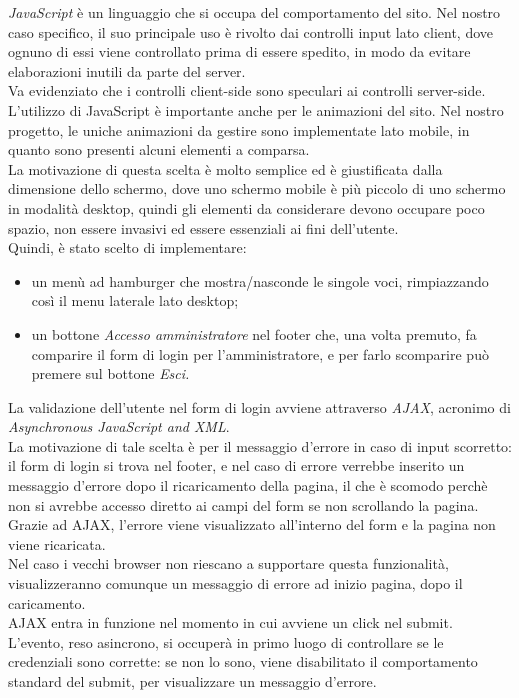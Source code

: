 ﻿\emph{JavaScript} è un linguaggio che si occupa del comportamento del sito. Nel nostro caso specifico, il suo principale uso è rivolto dai controlli 
input lato client, dove ognuno di essi viene controllato prima di essere spedito, in modo da evitare elaborazioni inutili da parte del server.\\
Va evidenziato che i controlli client-side sono speculari ai controlli server-side.\\
L'utilizzo di JavaScript è importante anche per le animazioni del sito. Nel nostro progetto, le uniche animazioni da gestire sono implementate 
lato mobile, in quanto sono presenti alcuni elementi a comparsa.\\
La motivazione di questa scelta è molto semplice ed è giustificata dalla dimensione dello schermo, dove uno schermo mobile è più piccolo di uno schermo
in modalità desktop, quindi gli elementi da considerare devono occupare poco spazio, non essere invasivi ed essere essenziali ai fini dell'utente. \\
Quindi, è stato scelto di implementare:
\begin{itemize}
    \item un menù ad hamburger che mostra/nasconde le singole voci, rimpiazzando così il menu laterale lato desktop;
    \item un bottone \emph{Accesso amministratore} nel footer che, una volta premuto, fa comparire il form di login per l'amministratore, e per farlo
    scomparire può premere sul bottone \emph{Esci.} 
\end{itemize}    

La validazione dell'utente nel form di login avviene attraverso \emph{AJAX}, acronimo di \emph{Asynchronous JavaScript and XML}.\\ 
La motivazione di tale scelta è per il messaggio d'errore in caso di input scorretto: il form di login si trova nel footer, e nel caso di errore 
verrebbe inserito un messaggio d'errore dopo il ricaricamento della pagina, il che è scomodo perchè non si avrebbe accesso diretto ai campi del form
se non scrollando la pagina.\\
Grazie ad AJAX, l'errore viene visualizzato all'interno del form e la pagina non viene ricaricata.\\
Nel caso i vecchi browser non riescano a supportare questa funzionalità, visualizzeranno comunque un messaggio di errore ad inizio pagina, 
dopo il caricamento.\\
AJAX entra in funzione nel momento in cui avviene un click nel submit. L'evento, reso asincrono, si occuperà in primo luogo di controllare 
se le credenziali sono corrette: se non lo sono, viene disabilitato il comportamento standard del submit, per visualizzare 
un messaggio d'errore.\\